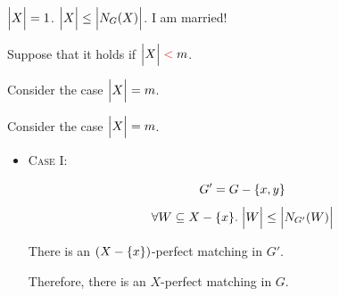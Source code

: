 \begin{frame}{}
  \begin{center}

    \pause
    \vspace{0.30cm}
    \begin{description}
      \setlength{\itemsep}{8pt}
      \item[Basis Step:] $\Big\lvert X \Big\rvert = 1$. $\Big\lvert X \Big\rvert \le \Big\lvert N_{G}(X) \Big\rvert$.
        I am married!
      \item[Induction Hypothesis:]
        Suppose that it holds if $\Big\lvert X \Big\rvert \;\textcolor{red}{<}\; m$.
      \item[Induction Step:]
        Consider the case $\Big\lvert X \Big\rvert = m$.
    \end{description}

    \pause
    \vspace{0.50cm}
  \end{center}
\end{frame}

\begin{frame}{}
  \begin{center}
    Consider the case $\Big\lvert X \Big\rvert = m$.

    \pause
    \vspace{0.50cm}
    \begin{itemize}
      \item \textsc{Case I:}

        \pause
        \vspace{0.20cm}
        \begin{center}

          \pause
          \[
            G' = G - \{x, y\}
          \]
          \pause
          \pause
          \[
            \forall W \subseteq X - \{x\}.\; \Big\lvert W \Big\rvert \le \Big\lvert N_{G'}(W) \Big\rvert
          \]

          \pause
          There is an $(X - \{x\})$-perfect matching in $G'$.

          \pause
          \vspace{0.60cm}
          Therefore, there is an $X$-perfect matching in $G$.
        \end{center}
    \end{itemize}
  \end{center}
\end{frame}

